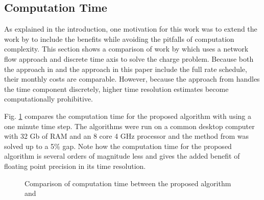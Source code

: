 \subsection{Computation Time\label{sec:results:time}} 
As explained in the introduction, one motivation for this work was to extend the work by \cite{mortensen_comprehensive_2021} to include the benefits while avoiding the pitfalls of computation complexity. This section shows a comparison of work by \cite{mortensen_comprehensive_2021} which uses a network flow approach and discrete time axis to solve the charge problem. Because both the approach in \cite{mortensen_comprehensive_2021} and the approach in this paper include the full rate schedule, their monthly costs are comparable. However, because the approach from \cite{mortensen_comprehensive_2021} handles the time component discretely, higher time resolution estimates become computationally prohibitive. 
\par Fig. \ref{fig:timeComparison} compares the computation time for the proposed algorithm with \cite{mortensen_comprehensive_2021} using a one minute time step. The algorithms were run on a common desktop computer with 32 Gb of RAM and an 8 core 4 GHz processor and the method from \cite{mortensen_comprehensive_2021} was solved up to a 5\% gap. Note how the computation time for the proposed algorithm is several orders of magnitude less and gives the added benefit of floating point precision in its time resolution.
\begin{figure}
	\centering
	\caption{Comparison of computation time between the proposed algorithm and \cite{mortensen_comprehensive_2021}}
	\label{fig:timeComparison}
\end{figure}







